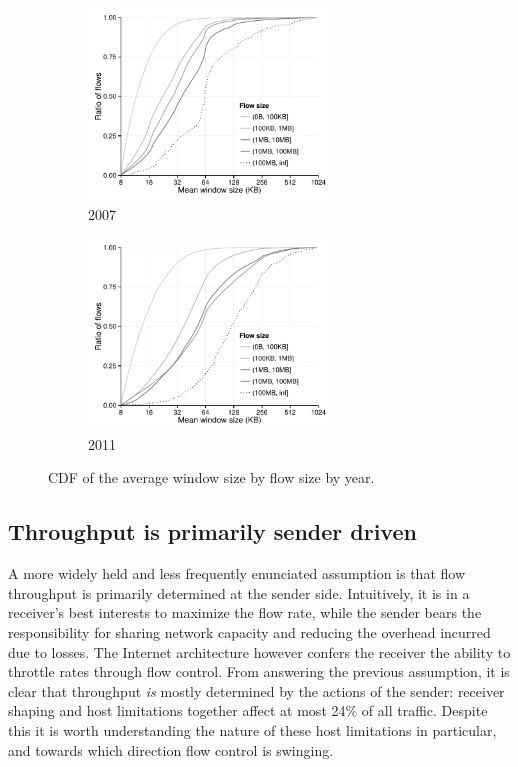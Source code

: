 \begin{figure}
    \begin{subfigure}[b]{.5\linewidth}
        \centering
        \includegraphics[width=2.5in]{figures/malawi/windowsize2007}
        \caption{2007}
    \end{subfigure}%
    \begin{subfigure}[b]{.5\linewidth}
        \centering
        \includegraphics[width=2.5in]{figures/malawi/windowsize2011}
        \caption{2011}
    \end{subfigure}%
    \caption{CDF of the average window size by flow size by year. \label{fig:windowsize}}
\end{figure}
 

\subsection{Throughput is primarily sender driven}

A more widely held and less frequently enunciated assumption is that flow throughput is primarily determined at the sender side. 
Intuitively, it is in a receiver's best interests to maximize the flow rate, while the sender bears the responsibility for sharing network capacity and reducing the overhead incurred due to losses. 
The Internet architecture however confers the receiver the ability to throttle rates through flow control. 
From answering the previous assumption, it is clear that throughput \textit{is} mostly determined by the actions of the sender: receiver shaping and host limitations together affect at most 24\% of all traffic. 
Despite this it is worth understanding the nature of these host limitations in particular, and towards which direction flow control is swinging.

